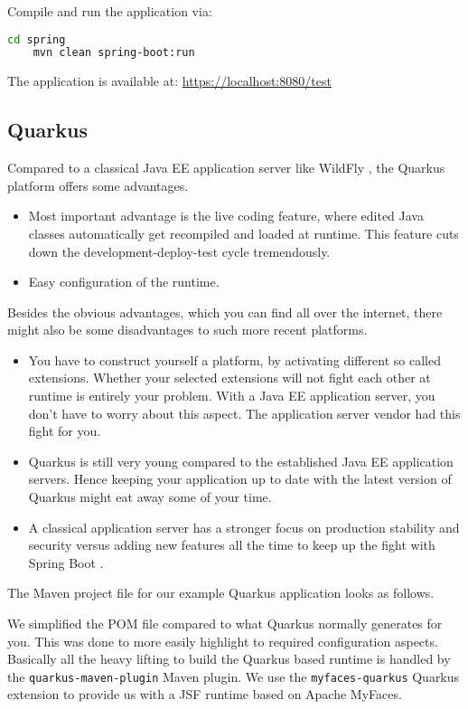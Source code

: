 Compile and run the application via:
\begin{lstlisting}[language=bash]
	cd spring
	mvn clean spring-boot:run
\end{lstlisting}
The application is available at:
\url{https://localhost:8080/test}



\subsection{Quarkus}

Compared to a classical Java EE application server like WildFly \cite{WildFly}, the Quarkus \cite{quarkus} platform offers some advantages.
\begin{itemize}
	\item Most important advantage is the live coding feature, where edited Java classes automatically get recompiled and loaded at runtime.
	This feature cuts down the development-deploy-test cycle tremendously.
	\item Easy configuration of the runtime.
\end{itemize}
Besides the obvious advantages, which you can find all over the internet, there might also be some disadvantages to such more recent platforms.
\begin{itemize}
	\item You have to construct yourself a platform, by activating different so called extensions.
	Whether your selected extensions will not fight each other at runtime is entirely your problem.
	With a Java EE application server, you don't have to worry about this aspect.
	The application server vendor had this fight for you.
	\item Quarkus is still very young compared to the established Java EE application servers.
	Hence keeping your application up to date with the latest version of Quarkus might eat away some of your time.
	\item A classical application server has a stronger focus on production stability and security versus adding new features all the time to keep up the fight with Spring Boot \cite{spring}.
\end{itemize}

The Maven project file for our example Quarkus application looks as follows.

We simplified the POM file compared to what Quarkus normally generates for you.
This was done to more easily highlight to required configuration aspects.
Basically all the heavy lifting to build the Quarkus based runtime is handled by the \texttt{quarkus-maven-plugin} Maven plugin.
We use the \texttt{myfaces-quarkus} Quarkus extension to provide us with a JSF runtime based on Apache MyFaces.


